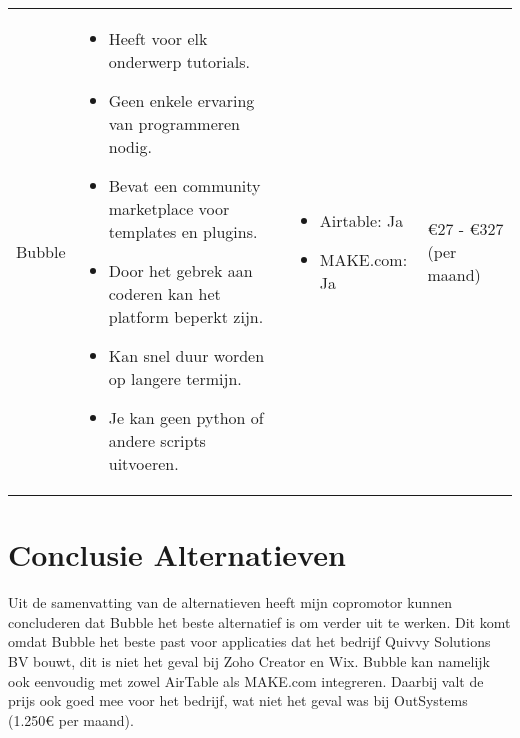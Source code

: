 \begin{longtable}{p{2.5cm} p{5.5cm} p{3.5cm} p{2.5cm}}
    Bubble & 
    \vspace{-\topsep}\vspace{-\partopsep} 
    \begin{itemize}[leftmargin=2pt, topsep=0pt,parsep=0pt,noitemsep]
        \item[] Heeft voor elk onderwerp tutorials.
        \item[] Geen enkele ervaring van programmeren nodig.
        \item[] Bevat een community marketplace voor templates en plugins.
    \end{itemize}
    \begin{itemize}[leftmargin=2pt, topsep=8pt,parsep=0pt,noitemsep]
        \item[] Door het gebrek aan coderen kan het platform beperkt zijn.
        \item[] Kan snel duur worden op langere termijn.
        \item[] Je kan geen python of andere scripts uitvoeren.
    \end{itemize} &
    \vspace{-\topsep}\vspace{-\partopsep} 
    \begin{itemize}[leftmargin=2pt, topsep=0pt,parsep=0pt,noitemsep]
        \item[]  Airtable: Ja
        \item[]  MAKE.com: Ja
    \end{itemize}
    &
    €27 - €327 (per maand)\\
\end{longtable}
\section{Conclusie Alternatieven}%
\label{sec:conclusie-alternatieven}
Uit de samenvatting van de alternatieven heeft mijn copromotor kunnen concluderen dat Bubble het beste alternatief is om verder uit te werken.
Dit komt omdat Bubble het beste past voor applicaties dat het bedrijf Quivvy Solutions BV bouwt, dit is niet het geval bij Zoho Creator en Wix. 
Bubble kan namelijk ook eenvoudig met zowel AirTable als MAKE.com integreren. Daarbij valt de prijs ook goed mee voor het bedrijf, wat niet het geval was bij OutSystems (1.250€ per maand).
